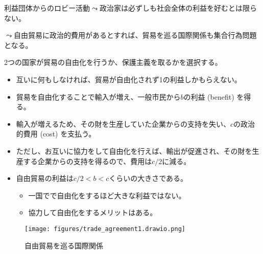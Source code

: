 \documentclass[
  xelatex,
  ja=standard]{bxjsarticle}
\providecommand{\tightlist}{%
  \setlength{\itemsep}{0pt}\setlength{\parskip}{0pt}}\usepackage{longtable,booktabs,array}
\begin{document}
利益団体からのロビー活動\(\leadsto\)政治家は必ずしも社会全体の利益を好むとは限らない。

\(\leadsto\)自由貿易に政治的費用があるとすれば、貿易を巡る国際関係も集合行為問題となる。

\begin{tcolorbox}[enhanced jigsaw, coltitle=black, breakable, opacitybacktitle=0.6, left=2mm, titlerule=0mm, arc=.35mm, colbacktitle=quarto-callout-tip-color!10!white, opacityback=0, leftrule=.75mm, title=\textcolor{quarto-callout-tip-color}{\faLightbulb}\hspace{0.5em}{自由貿易を巡る国際関係}, toptitle=1mm, bottomrule=.15mm, colframe=quarto-callout-tip-color-frame, toprule=.15mm, colback=white, rightrule=.15mm, bottomtitle=1mm]

2つの国家が貿易の自由化を行うか、保護主義を取るかを選択する。

\begin{itemize}
\tightlist
\item
  互いに何もしなければ、貿易が自由化されず1の利益しかもらえない。
\item
  貿易を自由化することで輸入が増え、一般市民から\(b\)の利益 (benefit)
  を得る。
\item
  輸入が増えるため、その財を生産していた企業からの支持を失い、\(c\)の政治的費用
  (cost) を支払う。
\item
  ただし、お互いに協力をして自由化を行えば、輸出が促進され、その財を生産する企業からの支持を得るので、費用は\(c/2\)に減る。
\item
  自由貿易の利益は\(c/2 < b < c\)くらいの大きさである。

  \begin{itemize}
  \tightlist
  \item
    一国でで自由化をするほど大きな利益ではない。
  \item
    協力して自由化をするメリットはある。
  \end{itemize}
\end{itemize}

\end{tcolorbox}

\begin{figure}[htpb]

{\centering \texttt{[image: figures/trade\_agreement1.drawio.png]}

}

\caption{自由貿易を巡る国際関係}

\end{figure}
\end{document}
